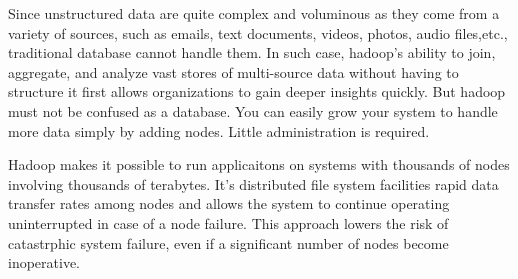 \documentclass[a4paper,12pt,oneside]{report}
\begin{document}
\par Since unstructured data are quite complex and voluminous as they come from a variety
of sources, such as emails, text documents, videos, photos, audio files,etc., traditional
database cannot handle them. In such case, hadoop’s ability to join, aggregate, and analyze
vast stores of multi-source data without having to structure it first allows organizations to
gain deeper insights quickly. But hadoop must not be confused as a database. You can easily grow your system to handle more data simply by adding nodes. Little administration is required.
\par Hadoop makes it possible to run applicaitons on systems with thousands of nodes involving thousands of terabytes. It's distributed file system facilities rapid
data transfer rates among nodes and allows the system to continue operating uninterrupted in case of a node failure. This approach lowers the risk of catastrphic system failure,
even if a significant number of nodes become inoperative.
\end{document}
